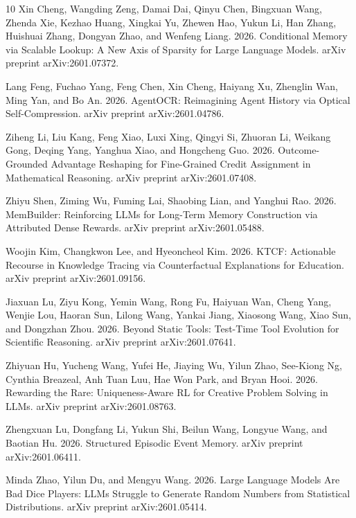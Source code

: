 \documentclass{article}
\begin{document}
\begin{thebibliography}{10}
Xin Cheng, Wangding Zeng, Damai Dai, Qinyu Chen, Bingxuan Wang, Zhenda Xie, Kezhao Huang, Xingkai Yu, Zhewen Hao, Yukun Li, Han Zhang, Huishuai Zhang, Dongyan Zhao, and Wenfeng Liang. 2026. Conditional Memory via Scalable Lookup: A New Axis of Sparsity for Large Language Models. arXiv preprint arXiv:2601.07372.

Lang Feng, Fuchao Yang, Feng Chen, Xin Cheng, Haiyang Xu, Zhenglin Wan, Ming Yan, and Bo An. 2026. AgentOCR: Reimagining Agent History via Optical Self-Compression. arXiv preprint arXiv:2601.04786.

Ziheng Li, Liu Kang, Feng Xiao, Luxi Xing, Qingyi Si, Zhuoran Li, Weikang Gong, Deqing Yang, Yanghua Xiao, and Hongcheng Guo. 2026. Outcome-Grounded Advantage Reshaping for Fine-Grained Credit Assignment in Mathematical Reasoning. arXiv preprint arXiv:2601.07408.

Zhiyu Shen, Ziming Wu, Fuming Lai, Shaobing Lian, and Yanghui Rao. 2026. MemBuilder: Reinforcing LLMs for Long-Term Memory Construction via Attributed Dense Rewards. arXiv preprint arXiv:2601.05488.

Woojin Kim, Changkwon Lee, and Hyeoncheol Kim. 2026. KTCF: Actionable Recourse in Knowledge Tracing via Counterfactual Explanations for Education. arXiv preprint arXiv:2601.09156.

Jiaxuan Lu, Ziyu Kong, Yemin Wang, Rong Fu, Haiyuan Wan, Cheng Yang, Wenjie Lou, Haoran Sun, Lilong Wang, Yankai Jiang, Xiaosong Wang, Xiao Sun, and Dongzhan Zhou. 2026. Beyond Static Tools: Test-Time Tool Evolution for Scientific Reasoning. arXiv preprint arXiv:2601.07641.

Zhiyuan Hu, Yucheng Wang, Yufei He, Jiaying Wu, Yilun Zhao, See-Kiong Ng, Cynthia Breazeal, Anh Tuan Luu, Hae Won Park, and Bryan Hooi. 2026. Rewarding the Rare: Uniqueness-Aware RL for Creative Problem Solving in LLMs. arXiv preprint arXiv:2601.08763.

Zhengxuan Lu, Dongfang Li, Yukun Shi, Beilun Wang, Longyue Wang, and Baotian Hu. 2026. Structured Episodic Event Memory. arXiv preprint arXiv:2601.06411.

Minda Zhao, Yilun Du, and Mengyu Wang. 2026. Large Language Models Are Bad Dice Players: LLMs Struggle to Generate Random Numbers from Statistical Distributions. arXiv preprint arXiv:2601.05414.


\end{thebibliography}
\end{document}
